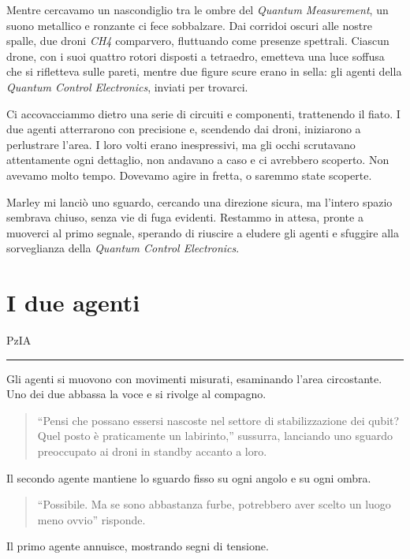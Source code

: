 Mentre cercavamo un nascondiglio tra le ombre del \textit{Quantum Measurement}, un suono metallico e ronzante ci fece sobbalzare. Dai corridoi oscuri alle nostre spalle, due droni \textit{CH4} comparvero, fluttuando come presenze spettrali. Ciascun drone, con i suoi quattro rotori disposti a tetraedro, emetteva una luce soffusa che si rifletteva sulle pareti, mentre due figure scure erano in sella: gli agenti della \textit{Quantum Control Electronics}, inviati per trovarci.

Ci accovacciammo dietro una serie di circuiti e componenti, trattenendo il fiato. I due agenti atterrarono con precisione e, scendendo dai droni, iniziarono a perlustrare l'area. I loro volti erano inespressivi, ma gli occhi scrutavano attentamente ogni dettaglio,  non andavano a caso e ci avrebbero scoperto.  Non avevamo molto tempo. Dovevamo agire in fretta, o saremmo state scoperte.

Marley mi lanciò uno sguardo, cercando una direzione sicura, ma l'intero spazio sembrava chiuso, senza vie di fuga evidenti. Restammo in attesa, pronte a muoverci al primo segnale, sperando di riuscire a eludere gli agenti e sfuggire alla sorveglianza della \textit{Quantum Control Electronics}.
\newpage
\section{I due agenti}
\vspace{1em}
\begin{center}PzIA\end{center}
\hrule
\vspace{1em}
Gli agenti si muovono con movimenti misurati, esaminando l'area circostante. Uno dei due abbassa la voce e si rivolge al compagno.

\begin{quote}
\enquote{Pensi che possano essersi nascoste nel settore di stabilizzazione dei qubit? Quel posto è praticamente un labirinto,} sussurra, lanciando uno sguardo preoccupato ai droni in standby accanto a loro.
\end{quote}

Il secondo agente mantiene lo sguardo fisso su ogni angolo e su ogni ombra.

\begin{quote}
\enquote{Possibile. Ma se sono abbastanza furbe, potrebbero aver scelto un luogo meno ovvio} risponde.
\end{quote}

Il primo agente annuisce, mostrando segni di tensione.

